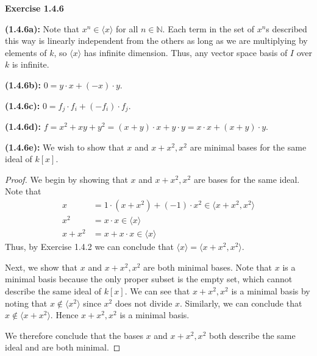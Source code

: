 \documentclass[12pt,oneside]{article}
\newenvironment{exercise}[1]{\vspace{.1in}\noindent\textbf{Exercise #1 \hspace{.05em}}}{}
\newcommand{\N}{\mathbb{N}}
\begin{document}
\begin{exercise}{1.4.6}

    \bigskip
    \textbf{(1.4.6a):} Note that $x^n \in \langle x \rangle$ for all $n \in \N$.
    Each term in the set of $x^n$s described this way is linearly independent from 
    the others as long as we are multiplying by elements of $k$, so $\langle x \rangle$ 
    has infinite dimension. Thus, any vector space basis of $I$ over $k$ is infinite.

    \bigskip
    \textbf{(1.4.6b):} $0 = y \cdot x + (-x) \cdot y$.

    \bigskip
    \textbf{(1.4.6c):} $0 = f_j \cdot f_i + (-f_i) \cdot f_j$.

    \bigskip
    \textbf{(1.4.6d):} $f = x^2+xy+y^2 = (x+y) \cdot x + y \cdot y = x \cdot x + (x+y) \cdot y$.

    \bigskip
    \textbf{(1.4.6e):} We wish to show that $x$ and $x+x^2,x^2$ are minimal 
    bases for the same ideal of $k[x]$. 
    \begin{proof}
        We begin by showing that $x$ and $x+x^2,x^2$ are bases for the same ideal.
        Note that 
        \begin{align*}
            x &= 1 \cdot (x+x^2) + (-1) \cdot x^2 \in \langle x+x^2,x^2 \rangle \\
            x^2 &= x \cdot x \in \langle x \rangle \\
            x+x^2 &= x + x \cdot x \in \langle x \rangle 
        \end{align*}
        Thus, by Exercise 1.4.2 we can conclude that $\langle x \rangle = \langle x+x^2,x^2 \rangle$.

        Next, we show that $x$ and $x+x^2,x^2$ are both minimal bases. Note that 
        $x$ is a minimal basis because the only proper subset is the empty set, 
        which cannot describe the same ideal of $k[x]$. We can see that $x+x^2,x^2$ is 
        a minimal basis by noting that $x \not \in \langle x^2 \rangle$ since 
        $x^2$ does not divide $x$. Similarly, we can conclude that $x \not \in \langle x+x^2 \rangle$.
        Hence $x+x^2,x^2$ is a minimal basis. 

        We therefore conclude that the bases $x$ and $x+x^2,x^2$ both describe 
        the same ideal and are both minimal.
    \end{proof}

\end{exercise}

\end{document}
